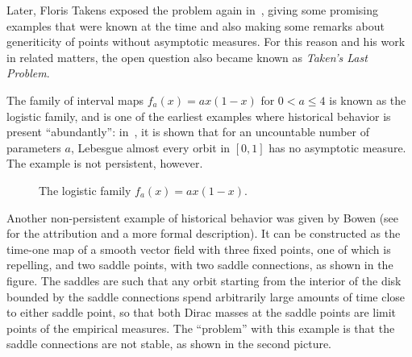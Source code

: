 \documentclass[../main]{subfiles}
\begin{document}
Later, Floris Takens exposed the problem again in~\cite{takensOrbitsHistoricBehaviour2008}, giving some promising examples that were known at the time and also making some remarks about generiticity of points without asymptotic measures. For this reason and his work in related matters, the open question also became known as \textit{Taken's Last Problem}.

\begin{example}
   The family of interval maps \(f_a(x) = ax(1 - x)\) for \(0 < a \le 4\) is known as the logistic family, and is one of the earliest examples where historical behavior is present ``abundantly'': in~\cite{hofbauerQuadraticMapsAsymptotic1990}, it is shown that for an uncountable number of parameters \(a\), Lebesgue almost every orbit in \([0,1]\) has no asymptotic measure. The example is not persistent, however.
\end{example}

\begin{figure}[h]
  \centering
  \caption{The logistic family $f_a(x) = ax(1-x)$.}
\end{figure}

\begin{example}
  Another non-persistent example of historical behavior was given by Bowen (see~\cite{takensHeteroclinicAttractorsTime1994} for the attribution and a more formal description). It can be constructed as the time-one map of a smooth vector field with three fixed points, one of which is repelling, and two saddle points, with two saddle connections, as shown in the figure. The saddles are such that any orbit starting from the interior of the disk bounded by the saddle connections spend arbitrarily large amounts of time close to either saddle point, so that both Dirac masses at the saddle points are limit points of the empirical measures. The ``problem'' with this example is that the saddle connections are not stable, as shown in the second picture.
\end{example}
\end{document}
